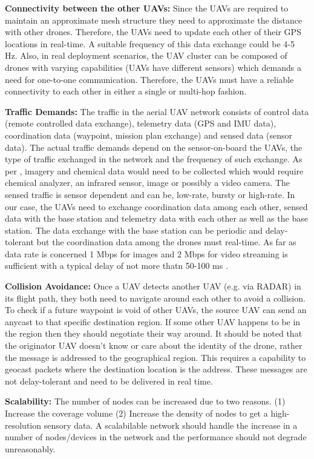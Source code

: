 \textbf{Connectivity between the other UAVs:} Since the UAVs are required to maintain an approximate mesh structure they need to approximate the distance with other drones. Therefore, the UAVs need to update each other of their GPS locations in real-time. A suitable frequency of this data exchange could be 4-5 Hz. Also, in real deployment scenarios, the UAV cluster can be composed of drones with varying capabilities (UAVs have different sensors) which demands a need for one-to-one communication. Therefore, the UAVs must have a reliable connectivity to each other in either a single or multi-hop fashion. 

\textbf{Traffic Demands:} The traffic in the aerial UAV network consists of control data (remote controlled data exchange), telemetry data (GPS and IMU data), coordination data (waypoint, mission plan exchange) and sensed data (sensor data). The actual traffic demands depend on the sensor-on-board the UAVs, the type of traffic exchanged in the network and the frequency of such exchange. As per \cite{NASA_UAV_mission_parameters}, imagery and chemical data would need to be collected which would require chemical analyzer, an infrared sensor, image or possibly a video camera. The sensed traffic is sensor dependent and can be, low-rate, bursty or high-rate. In our case, the UAVs need to exchange coordination data among each other, sensed data with the base station and telemetry data with each other as well as the base station. The data exchange with the base station can be periodic and delay-tolerant but the coordination data among the drones must real-time. As far as data rate is concerned 1 Mbps for images and 2 Mbps for video streaming is sufficient with a typical delay of not more thatn 50-100 ms \cite{7463007}. 

\textbf{Collision Avoidance:} Once a UAV detects another UAV (e.g. via RADAR) in its flight path, they both need to navigate around each other to avoid a collision. To check if a future waypoint is void of other UAVs, the source UAV can send an anycast to that specific destination region. If some other UAV happens to be in the region then they should negotiate their way around. It should be noted that the originator UAV doesn't know or care about the identity of the drone, rather the message is addressed to the geographical region. This requires a capability to geocast packets where the destination location is the address. These messages are not delay-tolerant and need to be delivered in real time.

\textbf{Scalability:} The number of nodes can be increased due to two reasons. (1) Increase the coverage volume (2) Increase the density of nodes to get a high-resolution sensory data. A scalabilable network  should handle the increase in a number of nodes/devices in the network and the performance should not degrade unreasonably. 

